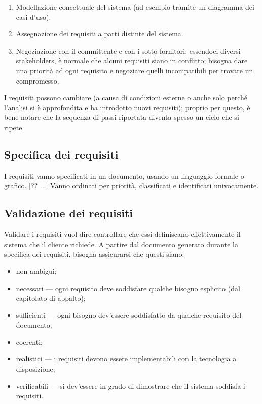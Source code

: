 \documentclass[a4paper]{article}
\begin{document}
\begin{enumerate}
	\item Modellazione concettuale del sistema (ad esempio tramite un diagramma dei casi d'uso).
			
	\item Assegnazione dei requisiti a parti distinte del sistema.
			
	\item Negoziazione con il committente e con i sotto-fornitori: essendoci diversi stakeholders, è normale che alcuni requisiti siano in conflitto; bisogna dare una priorità ad ogni requisito e negoziare quelli incompatibili per trovare un compromesso.
		
	\end{enumerate}

		
I requisiti possono cambiare (a causa di condizioni esterne o anche solo perché l'analisi si è approfondita e ha introdotto nuovi requisiti); proprio per questo, è bene notare che la sequenza di passi riportata diventa spesso un ciclo che si ripete.

		
	\subsection{Specifica dei requisiti}

		
I requisiti vanno specificati in un documento, usando un linguaggio formale o grafico. [?? ...] Vanno ordinati per priorità, classificati e identificati univocamente.

		
	\subsection{Validazione dei requisiti}

		
Validare i requisiti vuol dire controllare che essi definiscano effettivamente il sistema che il cliente richiede. A partire dal documento generato durante la specifica dei requisiti, bisogna assicurarsi che questi siano:
		
	\begin{itemize}
		
			
	\item non ambigui;
			
	\item necessari --- ogni requisito deve soddisfare qualche bisogno esplicito (dal capitolato di appalto);
			
	\item sufficienti --- ogni bisogno dev'essere soddisfatto da qualche requisito del documento;
			
	\item coerenti;
			
	\item realistici --- i requisiti devono essere implementabili con la tecnologia a disposizione;
			
	\item verificabili --- si dev'essere in grado di dimostrare che il sistema soddisfa i requisiti.
		
	\end{itemize}
\end{document}
